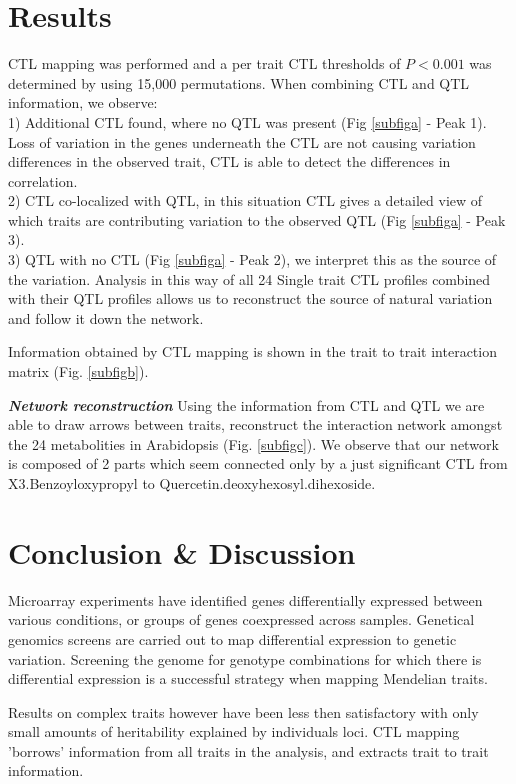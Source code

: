 \documentclass{bioinfo}
\begin{document}
\section{Results}
  CTL mapping was performed and a per trait CTL thresholds of $P < 0.001$ was 
  determined by using 15,000 permutations.
  When combining CTL and QTL information, we observe:\\
  1) Additional CTL found, where no QTL was present (Fig \ref{subfiga} - Peak 1). Loss of variation in the genes 
  underneath the CTL are not causing variation differences in the observed trait, CTL is able to 
  detect the differences in correlation.\\
  2) CTL co-localized with QTL, in this situation CTL gives a detailed view of which traits 
  are contributing variation to the observed QTL  (Fig \ref{subfiga} - Peak 3).\\
  3) QTL with no CTL  (Fig \ref{subfiga} - Peak 2), we interpret this as the source of the variation. Analysis in this way of 
  all 24 Single trait CTL profiles combined with their QTL profiles allows us to reconstruct the 
  source of natural variation and follow it down the network.

  Information obtained by CTL mapping is shown in the trait to trait interaction matrix (Fig. \ref{subfigb}).

\emph{ {\bf Network reconstruction}}
  Using the information from CTL and QTL we are able to draw arrows between traits, reconstruct the interaction 
  network amongst the 24 metabolities in Arabidopsis (Fig. \ref{subfigc}). We observe that our network is 
  composed of 2 parts which seem connected only by a just significant CTL from X3.Benzoyloxypropyl to 
  Quercetin.deoxyhexosyl.dihexoside.

\section{Conclusion \& Discussion}
  Microarray experiments have identified genes differentially expressed between various 
  conditions, or groups of genes coexpressed across samples. Genetical genomics screens 
  are carried out to map differential expression to genetic variation. Screening 
  the genome for genotype combinations for which there is differential expression is 
  a successful strategy when mapping Mendelian traits. 
  
  Results on complex traits however have been less then satisfactory with only small 
  amounts of heritability explained by individuals loci. CTL mapping 'borrows'
  information from all traits in the analysis, and extracts trait to trait 
   information.
 
\end{document}
